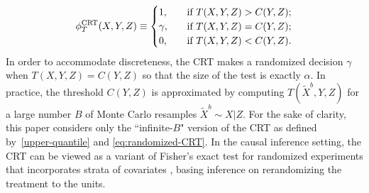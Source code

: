 \documentclass[12pt]{article}
\theoremstyle{definition}
\theoremstyle{remark}
\newcommand{\srx}{X}
\newcommand{\srz}{Z}
\newcommand{\srxk}{\widetilde X}
\newcommand{\sry}{Y}
\def\CRT{\textnormal{CRT}}
\begin{document}
\begin{equation}
	\label{eq:randomized-CRT}
	\phi^{\CRT}_T(\srx,\sry,\srz) \equiv 
	\begin{cases}
		1, \quad &\text{if }  T(\srx, \sry, \srz) > C(\sry,\srz); \\
		\gamma, \quad &\text{if }  T(\srx, \sry, \srz) = C(\sry,\srz); \\
		0, \quad &\text{if }T(\srx, \sry, \srz) < C(\sry,\srz).
	\end{cases}
\end{equation}
In order to accommodate discreteness, the CRT makes a randomized decision $\gamma$ when $T(\srx, \sry, \srz) = C(\sry,\srz)$ so that the size of the test is exactly $\alpha$.
In practice, the threshold $C(\sry,\srz)$ is approximated by computing $T(\srxk^b, \sry, \srz)$ for a large number $B$ of Monte Carlo resamples $\srxk^b \sim \srx|\srz$. %
For the sake of clarity, this paper considers only the ``infinite-$B$" version of the CRT as defined by~\eqref{upper-quantile} and \eqref{eq:randomized-CRT}. In the causal inference setting, the CRT can be viewed as a variant of Fisher's exact test for randomized experiments that incorporates strata of covariates \cite{Zheng2008,Hennessy2016}, basing inference on rerandomizing the treatment to the units. 
\end{document}
